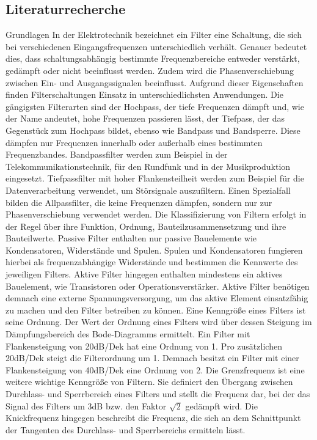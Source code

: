 \subsection{Literaturrecherche}
Grundlagen
In der Elektrotechnik bezeichnet ein Filter eine Schaltung, die sich bei verschiedenen Eingangsfrequenzen unterschiedlich verhält. Genauer bedeutet dies, dass schaltungsabhängig bestimmte Frequenzbereiche entweder verstärkt, gedämpft oder nicht beeinflusst werden. Zudem wird die Phasenverschiebung zwischen Ein- und Ausgangssignalen beeinflusst. Aufgrund dieser Eigenschaften finden Filterschaltungen Einsatz in unterschiedlichsten Anwendungen. Die gängigsten Filterarten sind der Hochpass, der tiefe Frequenzen dämpft und, wie der Name andeutet, hohe Frequenzen passieren lässt, der Tiefpass, der das Gegenstück zum Hochpass bildet, ebenso wie Bandpass und Bandsperre. Diese dämpfen nur Frequenzen innerhalb oder außerhalb eines bestimmten Frequenzbandes.
Bandpassfilter werden zum Beispiel in der Telekommunikationstechnik, für den Rundfunk und in der Musikproduktion eingesetzt. Tiefpassfilter mit hoher Flankensteilheit werden zum Beispiel für die Datenverarbeitung verwendet, um Störsignale auszufiltern. Einen Spezialfall bilden die Allpassfilter, die keine Frequenzen dämpfen, sondern nur zur Phasenverschiebung verwendet werden.
Die Klassifizierung von Filtern erfolgt in der Regel über ihre Funktion, Ordnung, Bauteilzusammensetzung und ihre Bauteilwerte. Passive Filter enthalten nur passive Bauelemente wie Kondensatoren, Widerstände und Spulen. Spulen und Kondensatoren fungieren hierbei als frequenzabhängige Widerstände und bestimmen die Kennwerte des jeweiligen Filters. Aktive Filter hingegen enthalten mindestens ein aktives Bauelement, wie Transistoren oder Operationsverstärker. Aktive Filter benötigen demnach eine externe Spannungsversorgung, um das aktive Element einsatzfähig zu machen und den Filter betreiben zu können.
Eine Kenngröße eines Filters ist seine Ordnung. Der Wert der Ordnung eines Filters wird über dessen Steigung im Dämpfungsbereich des Bode-Diagramms ermittelt. Ein Filter mit Flankensteigung von 20dB/Dek hat eine Ordnung von 1. Pro zusätzlichen 20dB/Dek steigt die Filterordnung um 1. Demnach besitzt ein Filter mit einer Flankensteigung von 40dB/Dek eine Ordnung von 2. 
Die Grenzfrequenz ist eine weitere wichtige Kenngröße von Filtern. Sie definiert den Übergang zwischen Durchlass- und Sperrbereich eines Filters und stellt die Frequenz dar, bei der das Signal des Filters um 3dB bzw. den Faktor $\sqrt{2}$ gedämpft wird.
Die Knickfrequenz hingegen beschreibt die Frequenz, die sich an dem Schnittpunkt der Tangenten des Durchlass- und Sperrbereichs ermitteln lässt. \cite{tkotz} \cite{kendall} \cite{tietze} 
